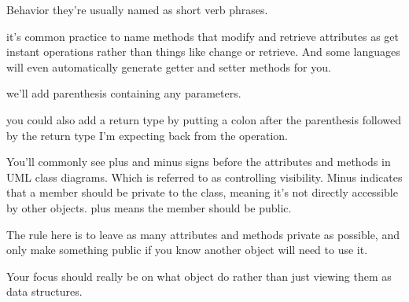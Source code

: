 Behavior 
  they're usually named as short verb phrases.

  it's common practice to name methods that modify and retrieve attributes as get instant operations rather than things like change or retrieve.
  And some languages will even automatically generate getter and setter methods for you.

  we'll add parenthesis containing any parameters.

  you could also add a return type by putting a colon after the parenthesis followed by the return type I'm expecting back from the operation.

  You'll commonly see plus and minus signs before the attributes and methods in UML class diagrams. 
  Which is referred to as controlling visibility.
  Minus indicates that a member should be private to the class, meaning it's not directly accessible by other objects.
  plus means the member should be public. 

  The rule here is to leave as many attributes and methods private as possible, and only make something public if you know another object will need to use it.

  Your focus should really be on what object do rather than just viewing them as data structures.

